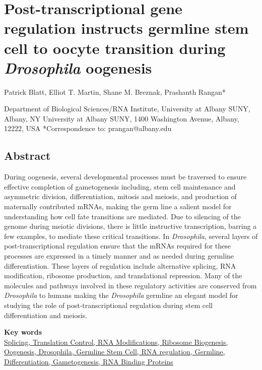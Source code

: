 \documentclass[12pt,oneside]{reedthesis}
\begin{document}
\hypertarget{post-transcriptional-gene-regulation-instructs-germline-stem-cell-to-oocyte-transition-during-drosophila-oogenesis}{%
\chapter{\texorpdfstring{Post-transcriptional gene regulation instructs germline stem cell to oocyte transition during \emph{Drosophila} oogenesis}{Post-transcriptional gene regulation instructs germline stem cell to oocyte transition during Drosophila oogenesis}}\label{post-transcriptional-gene-regulation-instructs-germline-stem-cell-to-oocyte-transition-during-drosophila-oogenesis}}

Patrick Blatt, Elliot T. Martin, Shane M. Breznak, Prashanth Rangan*

Department of Biological Sciences/RNA Institute, University at Albany
SUNY, Albany, NY
University at Albany SUNY, 1400 Washington Avenue, Albany, 12222, USA
*Correspondence to: prangan@albany.edu


\hypertarget{abstract}{%
\section{Abstract}\label{abstract}}

During oogenesis, several developmental processes must be traversed to
ensure effective completion of gametogenesis including, stem cell
maintenance and asymmetric division, differentiation, mitosis and
meiosis, and production of maternally contributed mRNAs, making the germ
line a salient model for understanding how cell fate transitions are
mediated. Due to silencing of the genome during meiotic divisions, there
is little instructive transcription, barring a few examples, to mediate
these critical transitions. In \emph{Drosophila}, several layers of
post-transcriptional regulation ensure that the mRNAs required for these
processes are expressed in a timely manner and as needed during germline
differentiation. These layers of regulation include alternative
splicing, RNA modification, ribosome production, and translational
repression. Many of the molecules and pathways involved in these
regulatory activities are conserved from \emph{Drosophila} to humans making
the \emph{Drosophila} germline an elegant model for studying the role of
post-transcriptional regulation during stem cell differentiation and
meiosis.

\textbf{Key words}\\
\underline{Splicing, Translation Control, RNA Modifications, Ribosome Biogenesis,}\\
\underline{Oogenesis, Drosophila, Germline Stem Cell, RNA regulation, Germline,}\\
\underline{Differentiation, Gametogenesis, RNA Binding Proteins}\\
\end{document}
